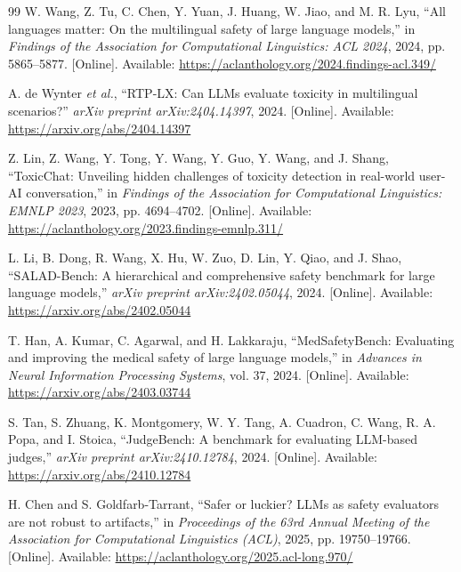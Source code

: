 \documentclass[11pt,a4paper]{article}
\begin{document}
\begin{thebibliography}{99}
W. Wang, Z. Tu, C. Chen, Y. Yuan, J. Huang, W. Jiao, and M. R. Lyu,
``All languages matter: On the multilingual safety of large language
models,''
in \emph{Findings of the Association for Computational Linguistics:
ACL 2024}, 2024, pp. 5865--5877.
[Online]. Available:
\url{https://aclanthology.org/2024.findings-acl.349/}

A. de Wynter \emph{et al.},
``RTP-LX: Can LLMs evaluate toxicity in multilingual scenarios?''
\emph{arXiv preprint arXiv:2404.14397}, 2024.
[Online]. Available: \url{https://arxiv.org/abs/2404.14397}

Z. Lin, Z. Wang, Y. Tong, Y. Wang, Y. Guo, Y. Wang, and J. Shang,
``ToxicChat: Unveiling hidden challenges of toxicity detection in
real-world user-AI conversation,''
in \emph{Findings of the Association for Computational Linguistics:
EMNLP 2023}, 2023, pp. 4694--4702.
[Online]. Available:
\url{https://aclanthology.org/2023.findings-emnlp.311/}

L. Li, B. Dong, R. Wang, X. Hu, W. Zuo, D. Lin, Y. Qiao, and J. Shao,
``SALAD-Bench: A hierarchical and comprehensive safety benchmark for
large language models,''
\emph{arXiv preprint arXiv:2402.05044}, 2024.
[Online]. Available: \url{https://arxiv.org/abs/2402.05044}

T. Han, A. Kumar, C. Agarwal, and H. Lakkaraju,
``MedSafetyBench: Evaluating and improving the medical safety of large
language models,''
in \emph{Advances in Neural Information Processing Systems},
vol. 37, 2024.
[Online]. Available: \url{https://arxiv.org/abs/2403.03744}

S. Tan, S. Zhuang, K. Montgomery, W. Y. Tang, A. Cuadron, C. Wang,
R. A. Popa, and I. Stoica,
``JudgeBench: A benchmark for evaluating LLM-based judges,''
\emph{arXiv preprint arXiv:2410.12784}, 2024.
[Online]. Available: \url{https://arxiv.org/abs/2410.12784}

H. Chen and S. Goldfarb-Tarrant,
``Safer or luckier? LLMs as safety evaluators are not robust to
artifacts,''
in \emph{Proceedings of the 63rd Annual Meeting of the Association
for Computational Linguistics (ACL)}, 2025, pp. 19750--19766.
[Online]. Available:
\url{https://aclanthology.org/2025.acl-long.970/}


\end{thebibliography}
\end{document}
